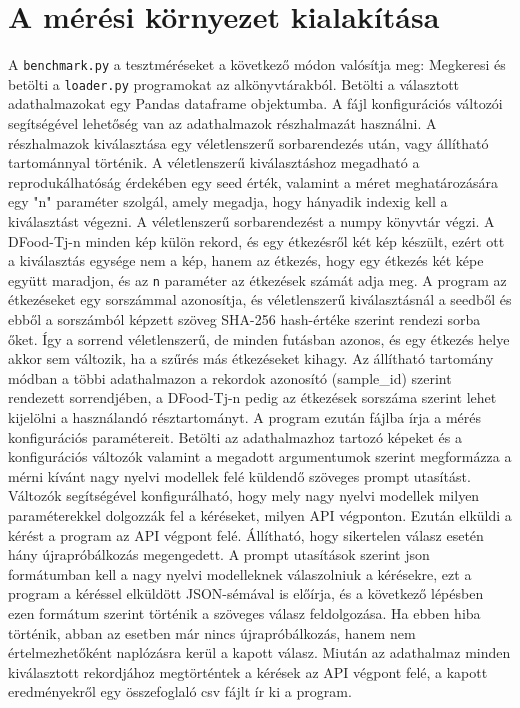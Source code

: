 \section{A mérési környezet kialakítása}
A \texttt{benchmark.py} a tesztméréseket a következő módon valósítja meg:
Megkeresi és betölti a \texttt{loader.py} programokat az alkönyvtárakból.
Betölti a választott adathalmazokat egy Pandas dataframe objektumba. A fájl konfigurációs változói segítségével
lehetőség van az adathalmazok részhalmazát használni. A részhalmazok  kiválasztása egy véletlenszerű sorbarendezés után, vagy állítható tartománnyal történik. A véletlenszerű kiválasztáshoz megadható a
reprodukálhatóság érdekében egy seed érték, valamint a méret meghatározására egy "n" paraméter szolgál, amely megadja, hogy hányadik indexig kell a kiválasztást
végezni. A véletlenszerű sorbarendezést a numpy könyvtár végzi. 
A DFood-Tj-n minden kép külön rekord, és egy étkezésről két kép készült, ezért ott a 
kiválasztás egysége nem a kép, hanem az étkezés, hogy egy étkezés két képe együtt maradjon, 
és az \texttt{n} paraméter az étkezések számát adja meg.
A program az étkezéseket egy sorszámmal azonosítja, és véletlenszerű kiválasztásnál a seedből és ebből a sorszámból képzett 
szöveg SHA-256 hash-értéke szerint rendezi sorba őket. Így a sorrend véletlenszerű, de minden 
futásban azonos, és egy étkezés helye akkor sem változik, ha a szűrés más étkezéseket kihagy. 
Az állítható tartomány módban a többi adathalmazon a rekordok azonosító (sample\_id) szerint 
rendezett sorrendjében, a DFood-Tj-n pedig az étkezések sorszáma szerint lehet kijelölni a 
használandó résztartományt.
A program ezután fájlba írja a mérés konfigurációs paramétereit.
Betölti az adathalmazhoz tartozó képeket és a konfigurációs változók valamint a megadott argumentumok szerint megformázza a mérni kívánt nagy nyelvi modellek
felé küldendő szöveges prompt utasítást. 
Változók segítségével konfigurálható, hogy mely nagy nyelvi modellek milyen paraméterekkel dolgozzák fel a kéréseket, milyen API végponton.
Ezután elküldi a kérést a program az API végpont felé. Állítható, hogy sikertelen válasz esetén hány újrapróbálkozás megengedett.
A prompt utasítások szerint json formátumban kell a nagy nyelvi modelleknek válaszolniuk a kérésekre, ezt a program a kéréssel elküldött JSON-sémával is előírja, és a következő lépésben ezen formátum szerint történik a szöveges
válasz feldolgozása. Ha ebben hiba történik, abban az esetben már nincs újrapróbálkozás, hanem nem értelmezhetőként naplózásra kerül a kapott válasz.
Miután az adathalmaz minden kiválasztott rekordjához megtörténtek a kérések az API végpont felé, a kapott eredményekről egy összefoglaló csv fájlt ír ki a program.

